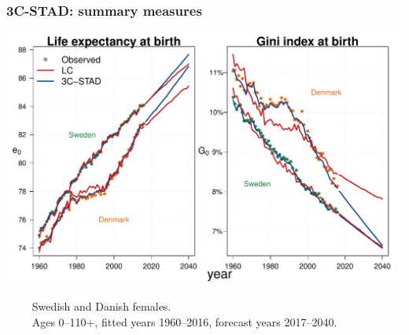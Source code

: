 \documentclass[12pt, xcolor=table]{beamer}  %
\begin{document}
%
%	
%	
%		
%		
%	

\begin{frame}[noframenumbering]\frametitle{3C-STAD: summary measures}

\vspace{-0.5cm}
	
	
	\begin{center}	
		\vspace{0.4cm}
		
		\includegraphics[scale=.42]{Figures/Ch3/F4_3_new}
		
	\end{center}

\vspace{-0.3cm}
\tiny{$\quad\quad$ Swedish and Danish females. \\ $\quad\quad$ Ages 0--110+, fitted years 1960--2016, forecast years 2017--2040.}
	
\end{frame}
\end{document}
